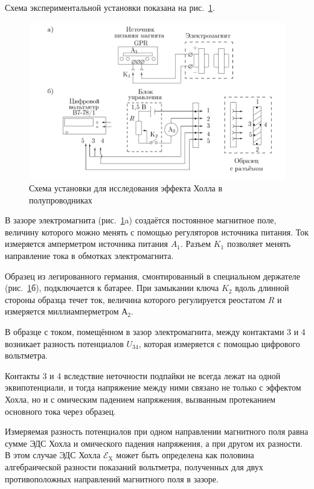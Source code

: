 \documentclass[a4paper,12pt]{article} %
\begin{document}
Схема экспериментальной установки показана на рис.~\ref{fig:setup}.
	
\begin{figure}[h]
\begin{center}
    \includegraphics[width=\linewidth]{setup.png}
\end{center}
\caption{Схема установки для исследования эффекта Холла в полупроводниках}
\label{fig:setup}
\end{figure}
  
В зазоре электромагнита (рис.~\ref{fig:setup}a) создаётся постоянное магнитное поле, величину которого можно менять с помощью регуляторов источника питания. Ток измеряется амперметром источника питания $A_{1}$. Разъем $K_{1}$ позволяет менять направление тока в обмотках электромагнита.
  
Образец из легированного германия, смонтированный в специальном держателе (рис.~\ref{fig:setup}б), подключается к батарее. При замыкании ключа $K_{2}$ вдоль длинной стороны образца течет ток, величина которого регулируется реостатом $R$ и измеряется миллиамперметром А$_{2}$.
  	
В образце с током, помещённом в зазор электромагнита, между контактами 3 и 4 возникает разность потенциалов $U_{34}$, которая измеряется с помощью цифрового вольтметра.
  	
Контакты 3 и 4 вследствие неточности подпайки не всегда лежат на одной
эквипотенциали, и тогда напряжение между ними связано не только с эффектом
Хохла, но и с омическим падением напряжения, вызванным протеканием основного тока через образец.
  	
Измеряемая разность потенциалов при одном направлении
магнитного поля равна сумме ЭДС Хохла и омического падения напряжения, а
при другом  их разности. В этом случае ЭДС Хохла $\mathscr{E}_\text{X}$ может быть определена как половина алгебраической разности показаний вольтметра, полученных для
двух противоположных направлений магнитного поля в зазоре.
  	
\end{document}
